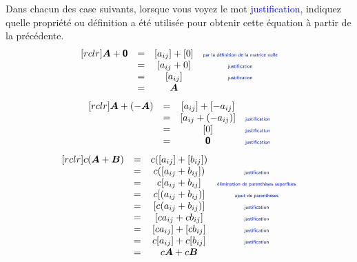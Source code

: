 \begin{exerciceB}
Dans chacun des case suivants, lorsque vous voyez le mot \textcolor{blue}{justification}, indiquez quelle
propriété ou définition a été utilisée pour obtenir cette équation à partir de la précédente.
\[
\begin{matrix}[rclr]
\matA + \zero &=& [a_{ij}] + [0] &\explain{par la définition de la matrice nulle}\\
    &=& [a_{ij} + 0] & \explain{justification}\\
    &=& [a_{ij}] &\explain{justification} \\
    &=& \matA
\end{matrix}
\]
\[
\begin{matrix}[rclr]
\matA + (-\matA)&=& [a_{ij}] + [-a_{ij}] &\\
    &=& [a_{ij} +(-a_{ij})] & \explain{justification}\\
    &=& [0] &\explain{justification} \\
    &=& \zero & \explain{justification}
\end{matrix}
\]
\[
\begin{matrix}[rclr]
c(\matA+\matB)&=& c([a_{ij}] + [b_{ij}]) &\\
    &=& c([a_{ij} +b_{ij}]) & \explain{justification}\\
    &=& c[a_{ij} +b_{ij}] & \explain{élimination de parenthèses superflues}\\
    &=& c[(a_{ij} +b_{ij})] & \explain{ajout de parenthèses}\\
    &=& [c(a_{ij} +b_{ij})] & \explain{justification}\\
    &=& [ca_{ij} + cb_{ij}] & \explain{justification}\\
    &=& [ca_{ij}] + [cb_{ij}] & \explain{justification}\\
    &=& c[a_{ij}] + c[b_{ij}] & \explain{justification}\\
    &=& c\matA + c\matB
\end{matrix}
\]
\end{exerciceB}


